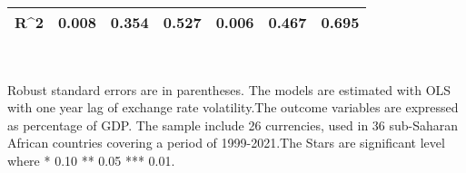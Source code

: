 \begin{table}[H]
\begin{adjustbox}{max width=\textwidth}
\begin{tabular}{l*{6}{c}}
R^{2}       &       0.008         &       0.354         &       0.527         &       0.006         &       0.467         &       0.695         \\
\bottomrule \end{tabular} \end{adjustbox} \\         \footnotesize \item Robust standard errors are in parentheses. The models are estimated with OLS with one year lag of exchange  rate volatility.The outcome variables are expressed as percentage of GDP. The sample include 26 currencies, used in 36 sub-Saharan African countries covering a period of 1999-2021.The Stars are significant level where * 0.10 ** 0.05 *** 0.01. \end{table}
